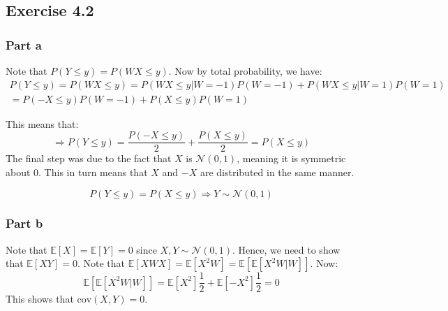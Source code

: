\documentclass{article}
\begin{document}
\subsection*{Exercise 4.2}
\subsubsection*{Part a}
\begin{flushleft}
Note that \(P(Y \leq y) = P(WX \leq y)\). Now by total probability, we have:
\begin{multline}
P(Y \leq y) = P(WX \leq y) = P(WX \leq y | W = -1)P(W = -1) + P(WX \leq y | W = 1)P(W = 1)\\= P(-X \leq y)P(W = -1) + P(X \leq y)P(W = 1)
\end{multline}

This means that:
\begin{equation}
\Rightarrow P(Y \leq y) = \frac{P(-X \leq y)}{2} + \frac{P(X \leq y)}{2} = P(X \leq y)
\end{equation}
The final step was due to the fact that \(X\) is \(\mathcal{N}(0, 1)\), meaning it is symmetric about 0. This in turn means that \(X\) and \(-X\) are distributed in the same manner.

\[P(Y \leq y) = P(X \leq y) \Rightarrow Y \sim \mathcal{N}(0, 1)\]
\end{flushleft}

\subsubsection*{Part b}
\begin{flushleft}
Note that \(\mathbb{E}[X] = \mathbb{E}[Y] = 0\) since \(X, Y \sim \mathcal{N}(0, 1)\). Hence, we need to show that \(\mathbb{E}[XY] = 0\). Note that \(\mathbb{E}[XWX] = \mathbb{E}[X^2W] = \mathbb{E}[\mathbb{E}[X^2W | W]]\). Now:
\begin{equation}
\mathbb{E}[\mathbb{E}[X^2W | W]] = \mathbb{E}[X^2] \frac{1}{2} + \mathbb{E}[-X^2] \frac{1}{2} = 0
\end{equation}
This shows that \(\mathrm{cov}(X, Y) = 0\).
\end{flushleft}
\end{document}
